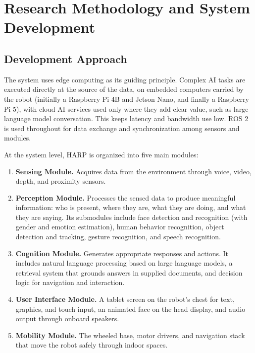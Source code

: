 \documentclass[11pt,a4paper]{article}
\begin{document}
\section{Research Methodology and System Development}
\label{sec:methodology}

\subsection{Development Approach}

The system uses edge computing as its guiding principle. Complex AI tasks are executed directly at the source of the data, on embedded computers carried by the robot (initially a Raspberry Pi 4B and Jetson Nano, and finally a Raspberry Pi 5), with cloud AI services used only where they add clear value, such as large language model conversation. This keeps latency and bandwidth use low. ROS 2 is used throughout for data exchange and synchronization among sensors and modules.

At the system level, HARP is organized into five main modules:

\begin{enumerate}
\item \textbf{Sensing Module.} Acquires data from the environment through voice, video, depth, and proximity sensors.
\item \textbf{Perception Module.} Processes the sensed data to produce meaningful information: who is present, where they are, what they are doing, and what they are saying. Its submodules include face detection and recognition (with gender and emotion estimation), human behavior recognition, object detection and tracking, gesture recognition, and speech recognition.
\item \textbf{Cognition Module.} Generates appropriate responses and actions. It includes natural language processing based on large language models, a retrieval system that grounds answers in supplied documents, and decision logic for navigation and interaction.
\item \textbf{User Interface Module.} A tablet screen on the robot's chest for text, graphics, and touch input, an animated face on the head display, and audio output through onboard speakers.
\item \textbf{Mobility Module.} The wheeled base, motor drivers, and navigation stack that move the robot safely through indoor spaces.
\end{enumerate}
\end{document}
